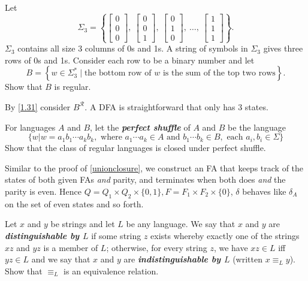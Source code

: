 \begin{exercise}{1.32}
  Let
  \[
    \Sigma_3 = \left\{
    \begin{bmatrix}
      0 \\ 0 \\ 0
    \end{bmatrix},\
    \begin{bmatrix}
      0 \\ 0 \\ 1
    \end{bmatrix},\
    \begin{bmatrix}
      0 \\ 1 \\ 0
    \end{bmatrix},\
    \dots,\
    \begin{bmatrix}
      1 \\ 1 \\ 1
    \end{bmatrix}
    \right\}.
  \]
  \noindent
  $\Sigma_3$ contains all size 3 columns of 0s and 1s. A string of symbols in $\Sigma_3$ gives three rows of 0s and 1s. Consider each row to be a binary number and let
  \[
    B = \left\{ w \in \Sigma_3^* \mid \text{the bottom row of } w \text{ is the sum of the top two rows} \right\}.
  \]
  \noindent
  Show that $B$ is regular.
\end{exercise}

By \ref{1.31} consider $B^{\mathcal{R}}$. A DFA is straightforward that only has 3 states.

\setcounter{exercise}{40}

\begin{exercise}{1.41}
  For languages $A$ and $B$, let the \textbf{\textit{perfect shuffle}} of $A$ and $B$ be the language
  \[
    \{w|w=a_1b_1\cdots a_kb_k,\text{ where }a_1\cdots a_k\in A\text{ and }b_1\cdots b_k\in B,\text{ each }a_i,b_i\in \Sigma\}
  \]
  Show that the class of regular languages is closed under perfect shuffle.
\end{exercise}

Similar to the proof of \ref{unionclosure}, we construct an FA that keeps track of the states of both given FAs \textit{and} parity, and terminates when both does \textit{and} the parity is even. Hence $Q=Q_1\times Q_2\times\{0,1\}, F=F_1\times F_2\times \{0\}$, $\delta$ behaves like $\delta_A$ on the set of even states and so forth.

\setcounter{exercise}{50}

\begin{exercise}{1.51}
  Let $x$ and $y$ be strings and let $L$ be any language. We say that $x$ and $y$ are \textbf{\textit{distinguishable by $L$}} if some string $z$ exists whereby exactly one of the strings $xz$ and $yz$ is a member of $L$; otherwise, for every string $z$, we have $xz \in L$ iff $yz \in L$ and we say that $x$ and $y$ are \textbf{\textit{indistinguishable by $L$}} (written $x \equiv_L y$). Show that $\equiv_L$ is an equivalence relation.
\end{exercise}


